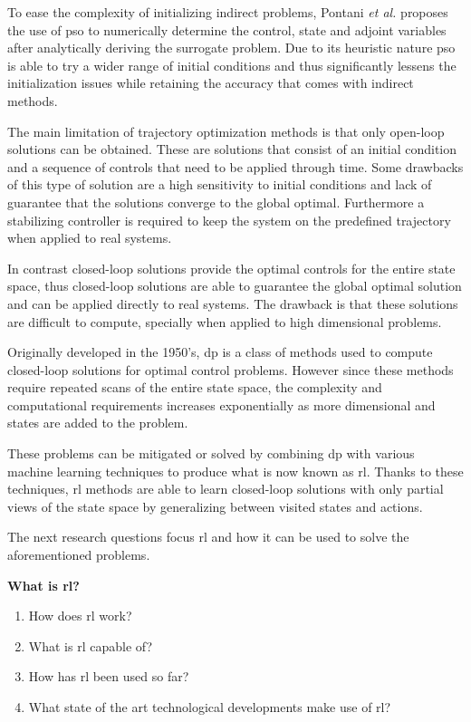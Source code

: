 To ease the complexity of initializing indirect problems, Pontani \emph{et al.} \cite{PONTANI2014852, pontani2013ascent, pontani2014simple, pontani2014optimal} proposes the use of \acrfull{pso} to numerically determine the control, state and adjoint variables after analytically deriving the surrogate problem. Due to its heuristic nature \acrshort{pso} is able to try a wider range of initial conditions and thus significantly lessens the initialization issues while retaining the accuracy that comes with indirect methods.

The main limitation of trajectory optimization methods is that only open-loop solutions can be obtained. These are solutions that consist of an initial condition and a sequence of controls that need to be applied through time. Some drawbacks of this type of solution are a high sensitivity to initial conditions and lack of guarantee that the solutions converge to the global optimal. Furthermore a stabilizing controller is required to keep the system on the predefined trajectory when applied to real systems.

In contrast closed-loop solutions provide the optimal controls for the entire state space, thus closed-loop solutions are able to guarantee the global optimal solution and can be applied directly to real systems. The drawback is that these solutions are difficult to compute, specially when applied to high dimensional problems.

Originally developed in the 1950's, \acrfull{dp} is a class of methods used to compute closed-loop solutions for optimal control problems. However since these methods require repeated scans of the entire state space, the complexity and computational requirements increases exponentially as more dimensional and states are added to the problem.

These problems can be mitigated or solved by combining \acrshort{dp} with various machine learning techniques to produce what is now known as \acrfull{rl}. Thanks to these techniques, \acrshort{rl} methods are able to learn closed-loop solutions with only partial views of the state space by generalizing between visited states and actions.

The next research questions focus \acrshort{rl} and how it can be used to solve the aforementioned problems. 

\textbf{What is \acrlong{rl}?}
\begin{enumerate}
  \item How does \acrshort{rl} work?
  \item What is \acrshort{rl} capable of?
  \item How has \acrshort{rl} been used so far?
  \item What state of the art technological developments make use of \acrshort{rl}?
\end{enumerate}

